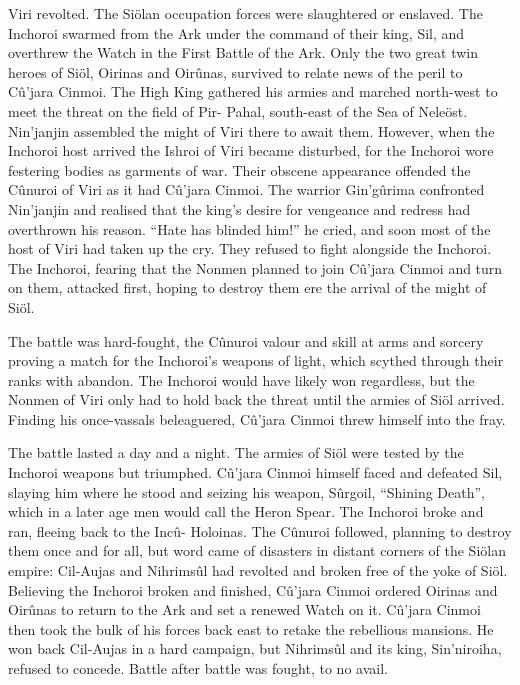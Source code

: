 \documentclass[]{book}
\begin{document}
Viri revolted. The Siölan occupation forces were slaughtered or enslaved. The Inchoroi
swarmed from the Ark under the command of their king, Sil, and overthrew the Watch
in the First Battle of the Ark. Only the two great twin heroes of Siöl, Oirinas and
Oirûnas, survived to relate news of the peril to Cû'jara Cinmoi. The High King
gathered his armies and marched north-west to meet the threat on the field of Pir-
Pahal, south-east of the Sea of Neleöst. Nin'janjin assembled the might of Viri there to
await them. However, when the Inchoroi host arrived the Ishroi of Viri became
disturbed, for the Inchoroi wore festering bodies as garments of war. Their obscene
appearance offended the Cûnuroi of Viri as it had Cû'jara Cinmoi. The warrior
Gin'gûrima confronted Nin'janjin and realised that the king's desire for vengeance and
redress had overthrown his reason. ``Hate has blinded him!'' he cried, and soon most of
the host of Viri had taken up the cry. They refused to fight alongside the Inchoroi. The
Inchoroi, fearing that the Nonmen planned to join Cû'jara Cinmoi and turn on them,
attacked first, hoping to destroy them ere the arrival of the might of Siöl.

The battle was hard-fought, the Cûnuroi valour and skill at arms and sorcery proving a
match for the Inchoroi's weapons of light, which scythed through their ranks with
abandon. The Inchoroi would have likely won regardless, but the Nonmen of Viri only
had to hold back the threat until the armies of Siöl arrived. Finding his once-vassals
beleaguered, Cû'jara Cinmoi threw himself into the fray.

The battle lasted a day and a night. The armies of Siöl were tested by the Inchoroi
weapons but triumphed. Cû'jara Cinmoi himself faced and defeated Sil, slaying him
where he stood and seizing his weapon, Sûrgoil, ``Shining Death'', which in a later age
men would call the Heron Spear. The Inchoroi broke and ran, fleeing back to the Incû-
Holoinas. The Cûnuroi followed, planning to destroy them once and for all, but word
came of disasters in distant corners of the Siölan empire: Cil-Aujas and Nihrimsûl had
revolted and broken free of the yoke of Siöl. Believing the Inchoroi broken and
finished, Cû'jara Cinmoi ordered Oirinas and Oirûnas to return to the Ark and set a
renewed Watch on it. Cû'jara Cinmoi then took the bulk of his forces back east to
retake the rebellious mansions. He won back Cil-Aujas in a hard campaign, but
Nihrimsûl and its king, Sin'niroiha, refused to concede. Battle after battle was fought,
to no avail.
\end{document}
